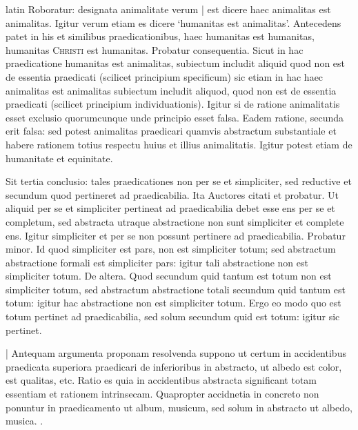 \begin{otherlanguage*}{latin}
\pstart
Roboratur:
designata animalitate verum \textnormal{|} est dicere haec animalitas est animalitas. Igitur verum etiam es dicere `humanitas est animalitas'. Antecedens patet in his et similibus praedicationibus, haec humanitas est humanitas, humanitas \textsc{Christi} est humanitas. Probatur consequentia. Sicut in hac praedicatione humanitas est animalitas, subiectum includit aliquid quod non est de essentia praedicati (scilicet principium specificum) sic etiam in hac haec animalitas est animalitas subiectum includit aliquod, quod non est de essentia praedicati (scilicet principium individuationis). Igitur si de ratione animalitatis esset exclusio quorumcunque unde principio esset falsa. Eadem ratione, secunda erit falsa:
sed potest animalitas praedicari quamvis abstractum substantiale et habere rationem totius respectu huius et illius animalitatis. Igitur potest etiam de humanitate et equinitate. 
\pend

\pstart
Sit tertia conclusio:
tales praedicationes non per se et simpliciter, sed reductive et secundum quod pertineret ad praedicabilia. Ita Auctores citati et probatur. Ut aliquid per se et simpliciter pertineat ad praedicabilia debet esse ens per se et completum, sed abstracta utraque abstractione non sunt simpliciter et complete ens. Igitur simpliciter et per se non possunt pertinere ad praedicabilia. Probatur minor. Id quod simpliciter est pars, non est simpliciter totum; sed abstractum abstractione formali est simpliciter pars:
igitur tali abstractione non est simpliciter totum. De altera. Quod secundum quid tantum est totum non est simpliciter totum, sed abstractum abstractione totali secundum quid tantum est totum:
igitur hac abstractione non est simpliciter totum. Ergo eo modo quo est totum pertinet ad praedicabilia, sed solum secundum quid est totum:
igitur sic pertinet. 
\pend

\pstart
\textnormal{|} Antequam argumenta proponam resolvenda suppono ut certum in accidentibus praedicata superiora praedicari de inferioribus in abstracto, ut albedo est color, est qualitas, etc. Ratio es quia in accidentibus abstracta significant totam essentiam et rationem intrinsecam. Quapropter accidnetia in concreto non ponuntur in praedicamento ut album, musicum, sed solum in abstracto ut albedo, musica. . 
\pend


\end{otherlanguage*}

